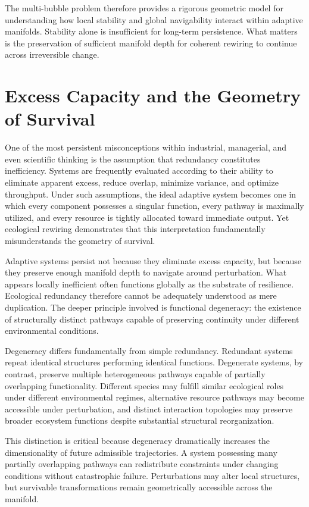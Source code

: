 \documentclass[11pt,a4paper]{article}
\begin{document}
The multi-bubble problem therefore provides a rigorous geometric model for understanding how local stability and global navigability interact within adaptive manifolds. Stability alone is insufficient for long-term persistence. What matters is the preservation of sufficient manifold depth for coherent rewiring to continue across irreversible change.


\newpage

\section{Excess Capacity and the Geometry of Survival}

One of the most persistent misconceptions within industrial, managerial, and even scientific thinking is the assumption that redundancy constitutes inefficiency. Systems are frequently evaluated according to their ability to eliminate apparent excess, reduce overlap, minimize variance, and optimize throughput. Under such assumptions, the ideal adaptive system becomes one in which every component possesses a singular function, every pathway is maximally utilized, and every resource is tightly allocated toward immediate output. Yet ecological rewiring demonstrates that this interpretation fundamentally misunderstands the geometry of survival.

Adaptive systems persist not because they eliminate excess capacity, but because they preserve enough manifold depth to navigate around perturbation. What appears locally inefficient often functions globally as the substrate of resilience. Ecological redundancy therefore cannot be adequately understood as mere duplication. The deeper principle involved is functional degeneracy: the existence of structurally distinct pathways capable of preserving continuity under different environmental conditions.

Degeneracy differs fundamentally from simple redundancy. Redundant systems repeat identical structures performing identical functions. Degenerate systems, by contrast, preserve multiple heterogeneous pathways capable of partially overlapping functionality. Different species may fulfill similar ecological roles under different environmental regimes, alternative resource pathways may become accessible under perturbation, and distinct interaction topologies may preserve broader ecosystem functions despite substantial structural reorganization.

This distinction is critical because degeneracy dramatically increases the dimensionality of future admissible trajectories. A system possessing many partially overlapping pathways can redistribute constraints under changing conditions without catastrophic failure. Perturbations may alter local structures, but survivable transformations remain geometrically accessible across the manifold.
\end{document}
